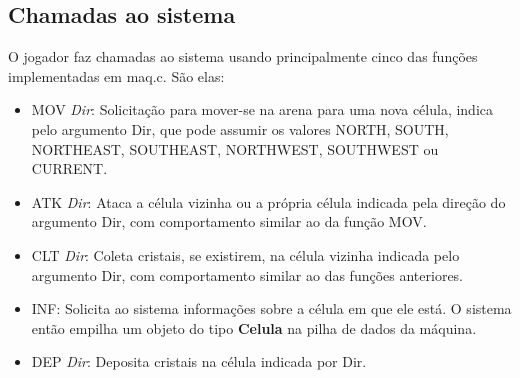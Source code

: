 \documentclass[12pt, a4paper]{article}
\begin{document}
\subsection{Chamadas ao sistema}
O jogador faz chamadas ao sistema usando principalmente cinco das funções implementadas em maq.c. São elas:
\begin{itemize}
\item MOV \textit{Dir}: Solicitação para mover-se na arena para uma nova célula, indica pelo argumento Dir, que pode assumir os valores NORTH, SOUTH, NORTHEAST, SOUTHEAST, NORTHWEST, SOUTHWEST ou CURRENT.
\item ATK \textit{Dir}: Ataca a célula vizinha ou a própria célula indicada pela direção do argumento Dir, com comportamento similar ao da função MOV.
\item CLT \textit{Dir}: Coleta cristais, se existirem, na célula vizinha indicada pelo argumento Dir, com comportamento similar ao das funções anteriores.
\item INF: Solicita ao sistema informações sobre a célula em que ele está. O sistema então empilha um objeto do tipo \textbf{Celula} na pilha de dados da máquina.
\item DEP \textit{Dir}: Deposita cristais na célula indicada por Dir.

\end{itemize}
\end{document}
